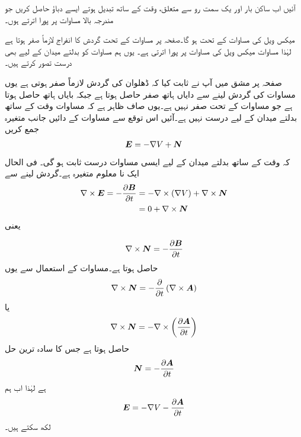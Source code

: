 آئیں اب ساکن بار اور یک سمت رو سے متعلق، وقت کے ساتھ تبدیل ہوتے ایسے دباؤ حاصل کریں جو مندرجہ بالا مساوات پر پورا اترتے ہوں۔

میکس ویل کی مساوات کے تحت  ہو گا۔صفحہ  پر مساوات  کے تحت گردش کا انفراج لازماً صفر ہوتا ہے لہٰذا مساوات  میکس ویل کی مساوات  پر پورا اترتی ہے۔ یوں ہم مساوات  کو بدلتے میدان کے لیے بھی درست تصور کرتے ہیں۔


صفحہ  پر مشق  میں آپ نے ثابت کیا کہ ڈھلوان کی گردش لازماً صفر ہوتی ہے یوں مساوات  کی گردش لینے سے دایاں ہاتھ صفر حاصل ہوتا ہے جبکہ بایاں ہاتھ  حاصل ہوتا ہے جو مساوات  کے تحت صفر نہیں ہے۔یوں صاف ظاہر ہے کہ مساوات  وقت کے ساتھ بدلتے میدان کے لیے درست نہیں ہے۔آئیں اس توقع سے مساوات  کے دائیں جانب متغیرہ  جمع کریں
\begin{align*}
{\ensuremath{{\boldsymbol{E}}}}=-\nabla V +{{\boldsymbol{N}}}
\end{align*}
 کہ وقت کے ساتھ بدلتے میدان کے لیے ایسی مساوات درست ثابت ہو گی۔ فی الحال  ایک نا معلوم متغیرہ ہے۔گردش لینے سے
\begin{align*}
\nabla \times {\ensuremath{{\boldsymbol{E}}}}=-\frac{\partial {\ensuremath{{\boldsymbol{B}}}}}{\partial t} &=-\nabla \times \left( \nabla V\right) +\nabla \times {\ensuremath{{\boldsymbol{N}}}}\\
&=0+\nabla \times {\ensuremath{{\boldsymbol{N}}}}
\end{align*}
یعنی

\begin{align*}
\nabla \times {\ensuremath{{\boldsymbol{N}}}}=-\frac{\partial {\ensuremath{{\boldsymbol{B}}}}}{\partial t}
\end{align*}
حاصل ہوتا ہے۔مساوات  کے استعمال سے یوں
\begin{align*}
\nabla \times {\ensuremath{{\boldsymbol{N}}}}=-\frac{\partial }{\partial t} \left(\nabla \times {\ensuremath{{\boldsymbol{A}}}} \right)
\end{align*}
یا
\begin{align*}
\nabla \times {\ensuremath{{\boldsymbol{N}}}}=-\nabla \times \left(\frac{\partial {\ensuremath{{\boldsymbol{A}}}}}{\partial t} \right)
\end{align*}
حاصل ہوتا ہے جس کا سادہ ترین حل
\begin{align*}
{\ensuremath{{\boldsymbol{N}}}}=-\frac{\partial {\ensuremath{{\boldsymbol{A}}}}}{\partial t}
\end{align*}
ہے لہٰذا اب ہم
\begin{align}\label{مساوات_میکس-ویل_بدلتا_میدان_مساوات_ٹ}
{\ensuremath{{\boldsymbol{E}}}}=-\nabla V -\frac{\partial {\ensuremath{{\boldsymbol{A}}}}}{\partial t}
\end{align}
 لکھ سکتے ہیں۔

